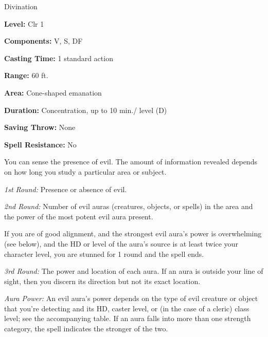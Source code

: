 
Divination

\textbf{Level:} Clr 1

\textbf{Components:} V, S, DF

\textbf{Casting Time:} 1 standard action

\textbf{Range:} 60 ft.

\textbf{Area:} Cone-shaped emanation

\textbf{Duration:} Concentration, up to 10 min./ level (D)

\textbf{Saving Throw:} None

\textbf{Spell Resistance:} No

You can sense the presence of evil. The amount of information revealed depends 
on how long you study a particular area or subject.

\textit{1st Round:} Presence or absence of evil.

\textit{2nd Round:} Number of evil auras (creatures, objects, or spells) in the 
area and the power of the most potent evil aura present.

If you are of good alignment, and the strongest evil aura's power is overwhelming 
(see below), and the HD or level of the aura's source is at least twice your character 
level, you are stunned for 1 round and the spell ends.

\textit{3rd Round:} The power and location of each aura. If an aura is outside 
your line of sight, then you discern its direction but not its exact location.

\textit{Aura Power:} An evil aura's power depends on the type of evil creature 
or object that you're detecting and its HD, caster level, or (in the case of a 
cleric) class level; see the accompanying table. If an aura falls into more than 
one strength category, the spell indicates the stronger of the two.

